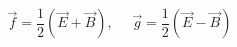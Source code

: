 \begin{equation}
\vec{f}=\frac{1}{2}(\vec{E}+\vec{B}),~~~~~~\vec{g}=\frac{1}{2}(\vec{E}-\vec{B})
\end{equation}

